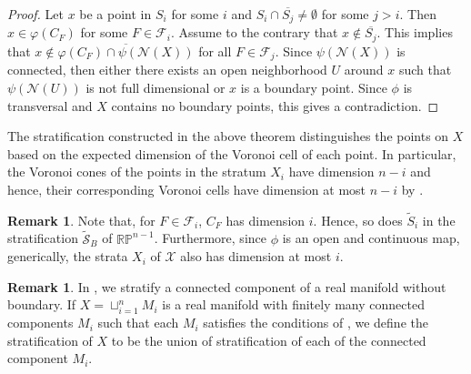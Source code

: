 \documentclass{article}
\numberwithin{theorem}{section}
\theoremstyle{definition}
\newtheorem{remark}[theorem]{Remark}
\theoremstyle{example_contd}
\newcommand{\N}{\mathcal{N}}
\newcommand{\F}{\mathcal{F}}
\newcommand{\Rp}{{\mathbb{RP}}}
\newcommand{\pn}{{\psi(\N(X))}}
\renewcommand{\S}{\mathcal{S}}
\begin{document}
\begin{proof}
    Let $x$ be a point in $S_i$ for some $i$ and $S_i\cap \overline{S_j}\neq \emptyset$ for some $j>i.$ Then $x \in \varphi(C_F)$ for some $F\in \F_i$. Assume to the contrary that $x \notin \overline{S_j}$. This implies that $x\notin \overline{\varphi(C_F)\cap \pn}$ for all $F\in \F_j$. Since $\pn$ is connected, then either there exists an open neighborhood $U$ around $x$ such that $\psi(\N(U))$ is not full dimensional or $x$ is a boundary point.  Since $\phi$ is transversal and $X$ contains no boundary points,
    this gives a contradiction.
\end{proof}


The stratification constructed in the above theorem distinguishes the points on $X$ based on the expected dimension of the Voronoi cell of each point. In particular, the Voronoi cones of the points in the stratum $X_i$ have dimension $n-i$ and hence, their corresponding Voronoi cells have dimension at most $n-i$ by .





\begin{remark}
	Note that, for $F\in \F_i$, $C_F$ has dimension $i.$ Hence, so does $\tilde{S}_i$ in the stratification $\tilde{\S}_B$ of $\Rp^{n-1}$. Furthermore, since $\phi$ is an open and continuous map, generically, the strata $X_i$ of $\mathcal{X}$ also has dimension at most $i.$
\end{remark}

\begin{remark} In , we stratify a connected component of a real manifold without boundary. If $X=\sqcup_{i=1}^n M_i$ is a real manifold with finitely many connected components $M_i$ such that each $M_i$ satisfies the conditions of , we define the stratification of $X$ to be the union of stratification of each of the connected component $M_i.$
\end{remark}
\end{document}
